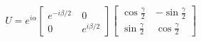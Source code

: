 \documentclass[preview]{standalone}
\begin{document}
\begin{align*}
U   = e^{i\alpha} \begin{bmatrix} e^{-i\beta/2}\
        & 0 \\[2mm] 0 & e^{i\beta/2} \end{bmatrix} \begin{bmatrix} \cos \frac{\gamma}{2}\
        & -\sin \frac{\gamma}{2} \\[2mm] \sin \frac{\gamma}{2} & \cos\frac{\gamma}{2} \end{bmatrix}
\end{align*}
\end{document}
